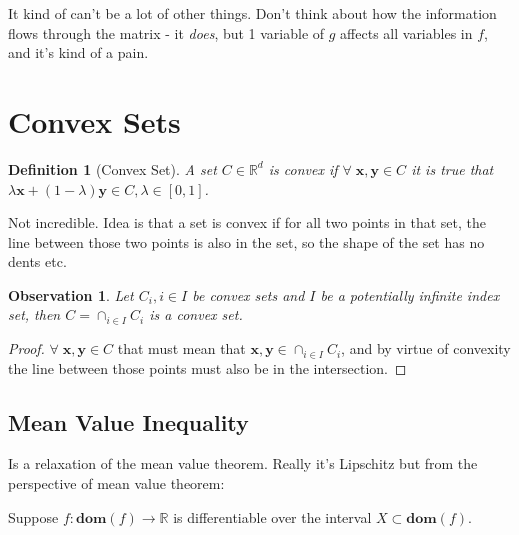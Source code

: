 \documentclass{article}
\newtheorem{definition}[theorem]{Definition}
\newtheorem{observation}[theorem]{Observation}
\begin{document}
		It kind of can't be a lot of other things. Don't think about how the information flows through the matrix - it \textit{does}, but 1 variable of $g$ affects all variables in $f$, and it's kind of a pain. 
		
\section{Convex Sets}

	\begin{definition}[Convex Set]
		A set $C\in\mathbb{R}^d$ is \textnormal{convex} if $\forall\;\mathbf{x, y}\in C$ it is true that $\lambda\mathbf{x} + (1-\lambda)\mathbf{y}\in C, \lambda\in [0,1]$.
	\end{definition}
	
	Not incredible. Idea is that a set is convex if for all two points in that set, the line between those two points is also in the set, so the shape of the set has no dents etc.
	
	\begin{observation}
		Let $C_i, i\in I$ be convex sets and $I$ be a potentially infinite index set, then $C = \cap_{i\in I} C_i $ is a convex set.
	\end{observation}
	
	\begin{proof}
		$\forall\;\mathbf{x, y}\in C$ that must mean that $\mathbf{x, y}\in \cap_{i\in I} C_i$, and by virtue of convexity the line between those points must also be in the intersection.
	\end{proof}
		
	\subsection{Mean Value Inequality}
	
		Is a relaxation of the mean value theorem. Really it's Lipschitz but from the perspective of mean value theorem:
		
		Suppose $f:\mathbf{dom}(f)\to\mathbb{R}$ is differentiable over the interval $X\subset\mathbf{dom}(f)$.
		
\end{document}
